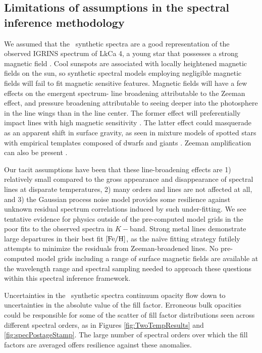\documentclass[twocolumn]{emulateapj}%
\begin{document}
\subsection{Limitations of assumptions in the spectral inference methodology}

We assumed that the \PHOENIX\ synthetic spectra are a good representation of the observed IGRINS spectrum of LkCa 4, a young star that possesses a strong magnetic field \citep{donati14}.  Cool sunspots are associated with locally heightened magnetic fields on the sun, so synthetic spectral models employing negligible magnetic fields will fail to fit magnetic sensitive features.  Magnetic fields will have a few effects on the emergent spectrum- line broadening attributable to the Zeeman effect, and pressure broadening attributable to seeing deeper into the photosphere in the line wings than in the line center.  The former effect will preferentially impact lines with high magnetic sensitivity \citep[\emph{e.g.}][]{johnskrull99,deen13}.  The latter effect could masquerade as an apparent shift in surface gravity, as seen in mixture models of spotted stars with empirical templates composed of dwarfs and giants \citep{oneal96}.  Zeeman amplification can also be present \citep{basri92}.

Our tacit assumptions have been that these line-broadening effects are 1) relatively small compared to the gross appearance and disappearance of spectral lines at disparate temperatures, 2) many orders and lines are not affected at all, and 3) the Gaussian process noise model provides some resilience against unknown residual spectrum correlations induced by such under-fitting.  We see tentative evidence for physics outside of the pre-computed model grids in the poor fits to the observed spectra in $K-$band.  Strong metal lines demonstrate large departures in their best fit $[{\rm Fe}/{\rm H}]$, as the na\"{i}ve fitting strategy futilely attempts to minimize the residuals from Zeeman-broadened lines.  No pre-computed model grids including a range of surface magnetic fields are available at the wavelength range and spectral sampling needed to approach these questions within this spectral inference framework.

Uncertainties in the \PHOENIX\ synthetic spectra continuum opacity flow down to uncertainties in the absolute value of the fill factor.  Erroneous bulk opacities could be responsible for some of the scatter of fill factor distributions seen across different spectral orders, as in Figures \ref{fig:TwoTempResults} and \ref{fig:specPostageStamp}.  The large number of spectral orders over which the fill factors are averaged offers resilience against these anomalies.
\end{document}
